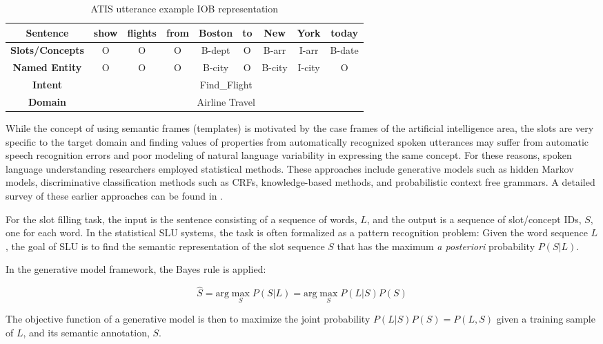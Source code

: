 \begin{table}
\begin{tabular}{|c|c|c|c|c|c|c|c|c|}
\hline
{\bf Sentence} & show & flights & from & Boston & to & New & York & today \\
\hline
{\bf Slots/Concepts} & O & O & O & B-dept & O & B-arr & I-arr & B-date \\
\hline
{\bf Named Entity} & O & O & O & B-city & O & B-city & I-city & O \\
\hline
{\bf Intent} & \multicolumn{8}{c|}{Find\_Flight} \\
\hline
{\bf Domain} & \multicolumn{8}{c|}{Airline Travel} \\
\hline
\end{tabular}
\caption{ATIS utterance example IOB representation}
\label{fig:iob}
\end{table}

While the concept of using semantic frames (templates) is motivated by the case
frames of the artificial intelligence area, the slots are very specific to the
target domain and finding values of properties from automatically recognized
spoken utterances may suffer from automatic speech recognition errors and poor
modeling of natural language variability in expressing the same concept. For
these reasons, spoken language understanding researchers employed statistical
methods. These approaches include generative models such as hidden Markov
models, discriminative classification methods such as CRFs, knowledge-based
methods, and probabilistic context free grammars. A detailed survey of these
earlier approaches can be found in \citep{rnn7}.

For the slot filling task, the input is the sentence consisting of a sequence
of words, $L$, and the output is a sequence of slot/concept IDs, $S$, one for each
word. In the statistical SLU systems, the task is often formalized as a pattern
recognition problem:  Given the word sequence $L$, the goal of SLU is to find the
semantic representation of the slot sequence $S$ that has the maximum {\it a
posteriori} probability $P(S | L)$. 

In the generative model framework, the Bayes rule is applied:

\begin{equation}
\hat{S} = \textrm{arg}\max_{S} P(S\vert L) = \textrm{arg}\max_{S} P(L \vert S) P (S)
\end{equation}

The objective function of a generative model is then to maximize the joint
probability $P(L | S)P(S) = P(L, S)$ given a training sample of $L$, and its semantic
annotation, $S$.

